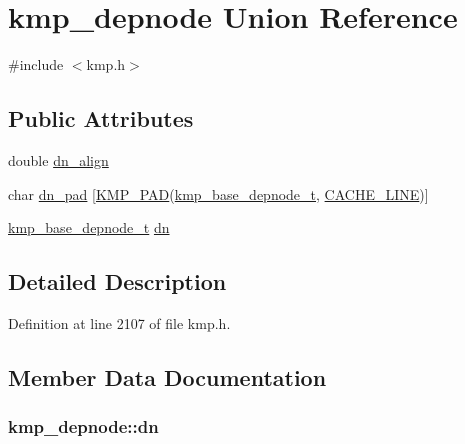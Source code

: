 \hypertarget{unionkmp__depnode}{\section{kmp\-\_\-depnode Union Reference}
\label{unionkmp__depnode}
}


{\ttfamily \#include $<$kmp.\-h$>$}

\subsection*{Public Attributes}
\begin{DoxyCompactItemize}
\item 
double \hyperlink{unionkmp__depnode_a347b4791e41750279971e4ec00993f7e}{dn\-\_\-align}
\item 
char \hyperlink{unionkmp__depnode_aad9f486cd3fe36dc5c4cf0c3580234a6}{dn\-\_\-pad} \mbox{[}\hyperlink{kmp__lock_8h_a7e782410115489f45ab1686c39a2bb89}{K\-M\-P\-\_\-\-P\-A\-D}(\hyperlink{kmp_8h_a02c8c93518ce0670ea0c9b9c8c23b014}{kmp\-\_\-base\-\_\-depnode\-\_\-t}, \hyperlink{kmp__os_8h_a86194c659a2d795e5f5949d293ae4661}{C\-A\-C\-H\-E\-\_\-\-L\-I\-N\-E})\mbox{]}
\item 
\hyperlink{kmp_8h_a02c8c93518ce0670ea0c9b9c8c23b014}{kmp\-\_\-base\-\_\-depnode\-\_\-t} \hyperlink{unionkmp__depnode_aad9c3578bf502dba0af949b9f8bf02f7}{dn}
\end{DoxyCompactItemize}


\subsection{Detailed Description}


Definition at line 2107 of file kmp.\-h.



\subsection{Member Data Documentation}
\hypertarget{unionkmp__depnode_aad9c3578bf502dba0af949b9f8bf02f7}{
\subsubsection[{dn}]{ kmp\-\_\-depnode\-::dn}}\label{unionkmp__depnode_aad9c3578bf502dba0af949b9f8bf02f7}


